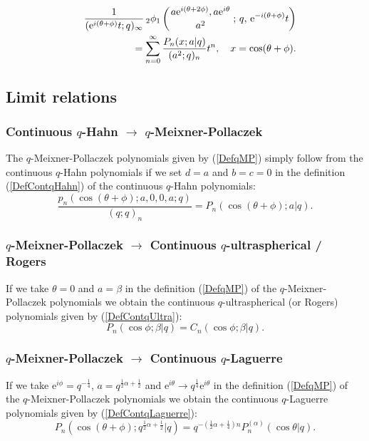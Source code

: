 \documentclass[envcountchap,graybox]{svmono}
\newcounter{rom}
\newcommand{\qhyp}[5]{\mbox{}_{#1}{\phi}_{#2}
\left(\genfrac{}{}{0pt}{}{#3}{#4}\,;\,q,\,#5\right)}
\newcommand{\e}{\textrm{e}}
\newcommand{\qhyp}[5]{\,\mbox{}_{#1}\phi_{#2}\!\left(
  \genfrac{}{}{0pt}{}{#3}{#4};#5\right)}
\begin{document}
\begin{eqnarray}
\label{GenqMP2}
& &\frac{1}{(\e^{i(\theta+\phi)}t;q)_{\infty}}\,
\qhyp{2}{1}{a\e^{i(\theta+2\phi)},a\e^{i\theta}}{a^2}{\e^{-i(\theta+\phi)}t}\nonumber\\
& &{}=\sum_{n=0}^{\infty}\frac{P_n(x;a|q)}{(a^2;q)_n}t^n,\quad x=\cos(\theta+\phi).
\end{eqnarray}

\subsection*{Limit relations}

\subsubsection*{Continuous $q$-Hahn $\rightarrow$ $q$-Meixner-Pollaczek}
The $q$-Meixner-Pollaczek polynomials given by (\ref{DefqMP}) simply follow
from the continuous $q$-Hahn polynomials if we set $d=a$ and $b=c=0$ in the
definition (\ref{DefContqHahn}) of the continuous $q$-Hahn polynomials:
$$\frac{p_n(\cos(\theta+\phi);a,0,0,a;q)}{(q;q)_n}=P_n(\cos(\theta+\phi);a|q).$$

\subsubsection*{$q$-Meixner-Pollaczek $\rightarrow$ Continuous $q$-ultraspherical /
Rogers}
If we take $\theta=0$ and $a=\beta$ in the definition (\ref{DefqMP}) of the
$q$-Meixner-Pollaczek polynomials we obtain the continuous
$q$-ultraspherical (or Rogers) polynomials given by (\ref{DefContqUltra}):
\begin{equation}
P_n(\cos\phi;\beta|q)=C_n(\cos\phi;\beta|q).
\end{equation}

\subsubsection*{$q$-Meixner-Pollaczek $\rightarrow$ Continuous
$q$-Laguerre}
If we take $\e^{i\phi}=q^{-\frac{1}{4}}$, $a=q^{\frac{1}{2}\alpha+\frac{1}{2}}$
and $\e^{i\theta}\rightarrow q^{\frac{1}{4}}\e^{i\theta}$ in the definition
(\ref{DefqMP}) of the $q$-Meixner-Pollaczek polynomials we obtain the
continuous $q$-Laguerre polynomials given by (\ref{DefContqLaguerre}):
\begin{equation}
P_n(\cos(\theta+\phi);q^{\frac{1}{2}\alpha+\frac{1}{2}}|q)=
q^{-(\frac{1}{2}\alpha+\frac{1}{4})n}P_n^{(\alpha)}(\cos\theta|q).
\end{equation}
\end{document}
